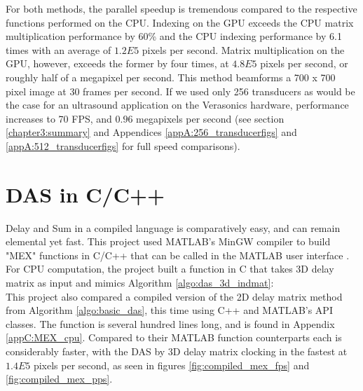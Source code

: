     


    For both methods, the parallel speedup is tremendous compared to the respective functions performed on the CPU. Indexing on the GPU exceeds the CPU matrix multiplication performance by 60\% and the CPU indexing performance by 6.1 times with an average of $1.2E5$ pixels per second. Matrix multiplication on the GPU, however, exceeds the former by four times, at $4.8E5$ pixels per second, or roughly half of a megapixel per second. This method beamforms a 700 x 700 pixel image at 30 frames per second. If we used only 256 transducers as would be the case for an ultrasound application on the Verasonics hardware, performance increases to 70 FPS, and $0.96$ megapixels per second (see section \ref{chapter3:summary} and Appendices \ref{appA:256_transducerfigs} and \ref{appA:512_transducerfigs} for full speed comparisons).

\section{DAS in C/C++}
\label{chapter3:compiled_DAS}

    Delay and Sum in a compiled language is comparatively easy, and can remain elemental yet fast. This project used MATLAB's MinGW compiler \cite{MATLABSupportMinGWw64} to build "MEX" functions in C/C++ that can be called in the MATLAB user interface \cite{CallMEXFunctions}. For CPU computation, the project built a function in C that takes 3D delay matrix as input and mimics Algorithm \ref{algo:das_3d_indmat}: 
    \\
    

    This project also compared a compiled version of the 2D delay matrix method from Algorithm \ref{algo:basic_das}, this time using C++ and MATLAB's API classes. The function is several hundred lines long, and is found in Appendix \ref{appC:MEX_cpu}. Compared to their MATLAB function counterparts each is considerably faster, with the DAS by 3D delay matrix clocking in the fastest at $1.4E5$ pixels per second, as seen in figures \ref{fig:compiled_mex_fps} and \ref{fig:compiled_mex_pps}.



